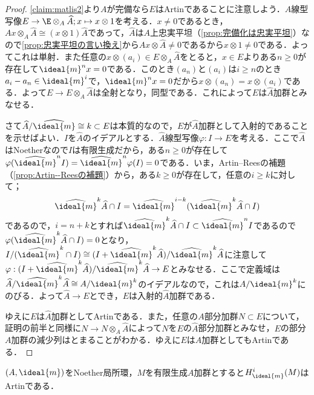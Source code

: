 \begin{proof}
	\ref{claim:matlis2}より$A$が完備なら$E$はArtinであることに注意しよう．$A$線型写像$E\to \E\otimes_A \widehat{A};x\mapsto x\otimes 1$を考える．$x\neq 0$であるとき，$Ax\otimes_A\widehat{A}\cong(x\otimes 1)\widehat{A}$であって，$\widehat{A}$は$A$上忠実平坦（\ref{prop:完備化は忠実平坦}）なので\ref{prop:忠実平坦の言い換え}から$Ax\otimes\widehat{A}\neq 0$であるから$x\otimes 1\neq 0$である．よってこれは単射．また任意の$x\otimes(a_i)\in E\otimes_A\widehat{A}$をとると，$x\in E$よりある$n\geq 0$が存在して$\ideal{m}^nx=0$である．このとき$(a_n)$と$(a_i)$は$i\geq n$のとき$a_i-a_n\in\ideal{m}^i$で，$\ideal{m}^nx=0$だから$x\otimes(a_n)=x\otimes(a_i)$である．よって$E\to E\otimes_A\widehat{A}$は全射となり，同型である．これによって$E$は$\widehat{A}$加群とみなせる．
	
	さて$\widehat{A}/\widehat{\ideal{m}}\cong k\subset E$は本質的なので，$E$が$\widehat{A}$加群として入射的であることを示せばよい．$I$を$\widehat{A}$のイデアルとする．$\widehat{A}$線型写像$\varphi:I\to E$を考える．ここで$\widehat{A}$はNoetherなので$I$は有限生成だから，ある$n\geq 0$が存在して$\varphi(\widehat{\ideal{m}}^nI)=\widehat{\ideal{m}}^n\varphi(I)=0$である．いま，Artin--Reesの補題（\ref{prop:Artin--Reesの補題}）から，ある$k\geq 0$が存在して，任意の$i\geq k$に対して；
	\[\widehat{\ideal{m}}^k\widehat{A}\cap I=\widehat{\ideal{m}}^{i-k}(\widehat{\ideal{m}}^k\widehat{A}\cap I)\]
	であるので，$i=n+k$とすれば$\widehat{\ideal{m}}^k\widehat{A}\cap I\subset\widehat{\ideal{m}}^n I$であるので$\varphi(\widehat{\ideal{m}}^k\widehat{A}\cap I)=0$となり，$I/(\widehat{\ideal{m}}^k\cap I)\cong (I+\widehat{\ideal{m}}^k\widehat{A})/\widehat{\ideal{m}}^k\widehat{A}$に注意して$\varphi:(I+\widehat{\ideal{m}}^k\widehat{A})/\widehat{\ideal{m}}^k\widehat{A}\to E$とみなせる．ここで定義域は$\widehat{A}/\widehat{\ideal{m}}^k\widehat{A}\cong A/\ideal{m}^k$のイデアルなので，これは$A/\ideal{m}^k$にのびる．よって$\widehat{A}\to E$とでき，$E$は入射的$\widehat{A}$加群である．
	
	ゆえに$E$は$\widehat{A}$加群としてArtinである．また，任意の$A$部分加群$N\subset E$について，証明の前半と同様に$N\to N\otimes_A\widehat{A}$によって$N$を$E$の$\widehat{A}$部分加群とみなせ，$E$の部分$A$加群の減少列はとまることがわかる．ゆえに$E$は$A$加群としてもArtinである．
\end{proof}

\begin{cor}\label{cor:局所コホモロジーはArtin}
	$(A,\ideal{m})$をNoether局所環，$M$を有限生成$A$加群とすると$H^i_{\ideal{m}}(M)$はArtinである．
\end{cor}

